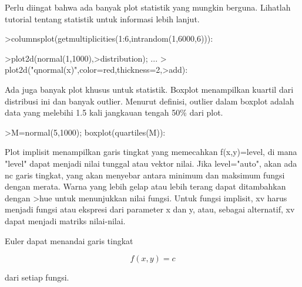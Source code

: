 \documentclass[a4paper,10pt]{article}
\begin{document}
\begin{eulernotebook}
\begin{eulercomment}
\begin{eulercomment}
\begin{eulercomment}
\begin{eulercomment}
\begin{eulercomment}
\begin{eulercomment}
\begin{eulerprompt}
\end{eulerprompt}
\begin{eulercomment}
Perlu diingat bahwa ada banyak plot statistik yang mungkin berguna.
Lihatlah tutorial tentang statistik untuk informasi lebih lanjut.
\end{eulercomment}
\begin{eulerprompt}
>columnsplot(getmultiplicities(1:6,intrandom(1,6000,6))):
\end{eulerprompt}
\begin{eulerprompt}
>plot2d(normal(1,1000),>distribution); ...
>  plot2d("qnormal(x)",color=red,thickness=2,>add):
\end{eulerprompt}
\begin{eulercomment}
Ada juga banyak plot khusus untuk statistik. Boxplot menampilkan
kuartil dari distribusi ini dan banyak outlier. Menurut definisi,
outlier dalam boxplot adalah data yang melebihi 1.5 kali jangkauan
tengah 50\% dari plot.
\end{eulercomment}
\begin{eulerprompt}
>M=normal(5,1000); boxplot(quartiles(M)):
\end{eulerprompt}
\begin{eulercomment}
Plot implisit menampilkan garis tingkat yang memecahkan f(x,y)=level,
di mana "level" dapat menjadi nilai tunggal atau vektor nilai. Jika
level="auto", akan ada nc garis tingkat, yang akan menyebar antara
minimum dan maksimum fungsi dengan merata. Warna yang lebih gelap atau
lebih terang dapat ditambahkan dengan \textgreater{}hue untuk menunjukkan nilai
fungsi. Untuk fungsi implisit, xv harus menjadi fungsi atau ekspresi
dari parameter x dan y, atau, sebagai alternatif, xv dapat menjadi
matriks nilai-nilai.

Euler dapat menandai garis tingkat

\end{eulercomment}
\begin{eulerformula}
\[
f(x,y) = c
\]
\end{eulerformula}
\begin{eulercomment}
dari setiap fungsi.


\end{eulercomment}
\end{eulercomment}
\end{eulercomment}
\end{eulercomment}
\end{eulercomment}
\end{eulercomment}
\end{eulercomment}
\end{eulernotebook}
\end{document}
